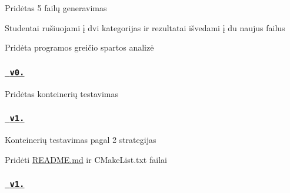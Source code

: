 \begin{DoxyItemize}
\item Pridėtas 5 failų generavimas
\item Studentai rušiuojami į dvi kategorijas ir rezultatai išvedami į du naujus failus
\item Pridėta programos greičio spartos analizė \subsubsection*{}
\end{DoxyItemize}

\subsubsection*{\href{https://github.com/karas245/2-uzd/releases/tag/v0.5}{\texttt{ v0.}}}


\begin{DoxyItemize}
\item Pridėtas konteinerių testavimas \subsubsection*{}
\end{DoxyItemize}

\subsubsection*{\href{https://github.com/karas245/2-uzd/releases/tag/v1.0}{\texttt{ v1.}}}


\begin{DoxyItemize}
\item Konteinerių testavimas pagal 2 strategijas
\item Pridėti \mbox{\hyperlink{_r_e_a_d_m_e_8md}{R\+E\+A\+D\+M\+E.\+md}} ir C\+Make\+List.\+txt failai \subsubsection*{}
\end{DoxyItemize}

\subsubsection*{\href{https://github.com/karas245/3-uzd/releases/tag/v1.1}{\texttt{ v1.}}}


